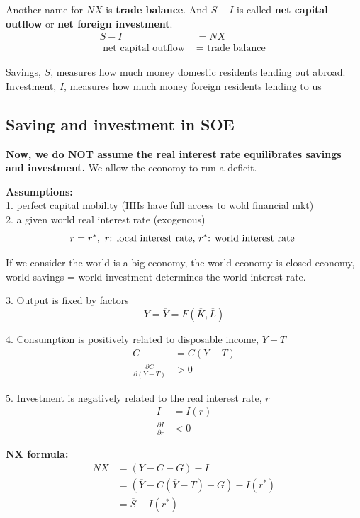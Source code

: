 \documentclass[12pt]{article}
\begin{document}
Another name for $ NX $ is {\textbf {trade balance}}. And $ S - I $ is called
{\textbf {net capital outflow}} or {\textbf {net foreign investment}}.
\begin{align*}
S - I &= NX\\
\text{ net capital outflow } &= \text{ trade balance }
\end{align*}

Savings, $ S $, measures how much money domestic residents lending out abroad.
Investment, $ I $, measures how much money foreign residents lending to us




\subsection{Saving and investment in SOE}
{\textbf {Now, we do NOT assume the real interest rate equilibrates savings and 
investment.}} We allow the economy to run a deficit.

{\textbf {Assumptions:}}\\
1. perfect capital mobility (HHs have full access to wold financial mkt)\\
2. a given world real interest rate (exogenous)
\begin{equation*}
r = r^{*}, \text{ $ r $: local interest rate, $ r^{*} $: world interest rate }
\end{equation*}

If we consider the world is a big economy, the world economy is  closed economy,
world savings = world investment determines the world interest rate.




3. Output is fixed by factors
\begin{equation*}
Y =  \overline{Y} = F( \overline{K},  \overline{L})
\end{equation*}

4. Consumption is positively related to disposable income, $ Y - T $
\begin{align*}
C &= C(Y - T)\\
\frac{\partial C }{\partial (Y - T) } &> 0
\end{align*}

5. Investment is negatively related to the real interest rate, $ r $
\begin{align*}
I &= I(r)\\
\frac{\partial I }{\partial r } &< 0 
\end{align*}


{\textbf {NX formula:}}
\begin{align*}
NX &= (Y - C - G) - I\\
 &= ( \overline{Y} - C( \overline{Y} - T) - G) - I(r^{*})\\
 &=  \overline{S} - I(r^{*})
\end{align*}
\end{document}
